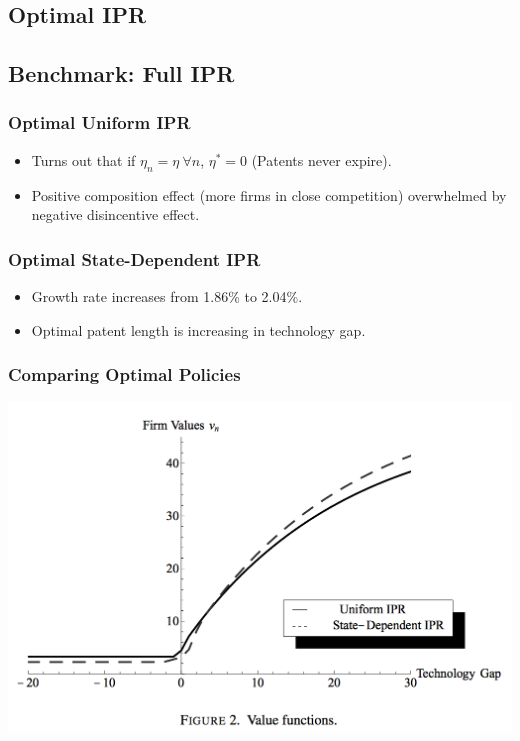 \documentclass{beamer}
\begin{document}
\subsection{Optimal IPR}
\label{sub:optimal_ipr}
\subsection{Benchmark: Full IPR}
\label{sub:benchmark_full_ipr}
\begin{frame}[t]\frametitle{Optimal Uniform IPR} 
  \begin{itemize}
	  \vspace{15mm}
    \item<+-> Turns out that if $\eta_n = \eta \ \forall n$, $\eta^* = 0$ (Patents never expire).
	\vspace{2mm}
    \item<+-> Positive composition effect (more firms in close competition) overwhelmed by negative disincentive effect.
  \end{itemize}
\end{frame}

\begin{frame}[t]\frametitle{Optimal State-Dependent IPR} 
  \begin{itemize}
	  \vspace{15mm}
    \item<+-> Growth rate increases from 1.86\% to 2.04\%.
	\vspace{2mm}
    \item<+-> Optimal patent length is increasing in technology gap. 
  \end{itemize}
\end{frame}

\begin{frame}[t]\frametitle{Comparing Optimal Policies} 
  \begin{center}
    \includegraphics[scale=.31]{full_ipr_value.png}
    \label{fig:full_ipr_value}
  \end{center}
\end{frame}
\end{document}

